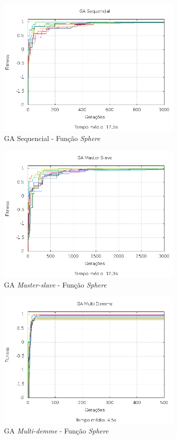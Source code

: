 \documentclass[12pt]{article}
\begin{document}
\begin{figure}[hp]
  \centering
  \includegraphics[width=0.8\textwidth]{seq_f1.png}
  \caption{GA Sequencial - Função \emph{Sphere}}
\end{figure}

\begin{figure}[hp]
  \centering
  \includegraphics[width=0.8\textwidth]{ms_f1.png}
  \caption{GA \emph{Master-slave} - Função \emph{Sphere}}
\end{figure}

\begin{figure}[hp]
  \centering
  \includegraphics[width=0.8\textwidth]{md_f1.png}
  \caption{GA \emph{Multi-demme} - Função \emph{Sphere}}
\end{figure}
\end{document}
